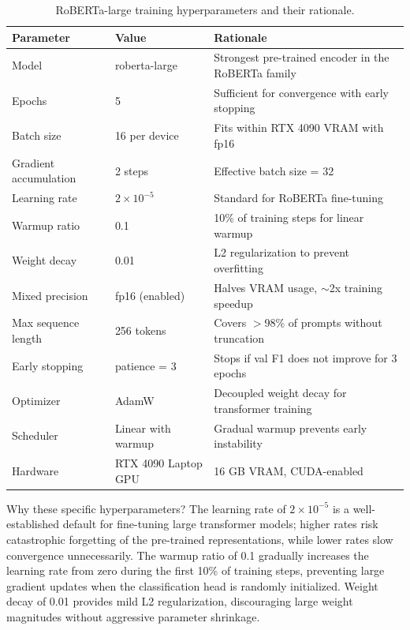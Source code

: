 \documentclass[12pt, letterpaper]{article}   %
\begin{document}
\begin{table}[h!]
    \centering
    \renewcommand{\arraystretch}{1.5}
    \begin{tabularx}{\textwidth}{|l|l|X|}
        \hline
        \textbf{Parameter} & \textbf{Value} & \textbf{Rationale} \\ \hline
        Model & roberta-large & Strongest pre-trained encoder in the RoBERTa family \\ \hline
        Epochs & 5 & Sufficient for convergence with early stopping \\ \hline
        Batch size & 16 per device & Fits within RTX 4090 VRAM with fp16 \\ \hline
        Gradient accumulation & 2 steps & Effective batch size = 32 \\ \hline
        Learning rate & $2 \times 10^{-5}$ & Standard for RoBERTa fine-tuning \\ \hline
        Warmup ratio & 0.1 & 10\% of training steps for linear warmup \\ \hline
        Weight decay & 0.01 & L2 regularization to prevent overfitting \\ \hline
        Mixed precision & fp16 (enabled) & Halves VRAM usage, $\sim$2x training speedup \\ \hline
        Max sequence length & 256 tokens & Covers $>$98\% of prompts without truncation \\ \hline
        Early stopping & patience = 3 & Stops if val F1 does not improve for 3 epochs \\ \hline
        Optimizer & AdamW & Decoupled weight decay for transformer training \\ \hline
        Scheduler & Linear with warmup & Gradual warmup prevents early instability \\ \hline
        Hardware & RTX 4090 Laptop GPU & 16 GB VRAM, CUDA-enabled \\ \hline
    \end{tabularx}
    \caption{RoBERTa-large training hyperparameters and their rationale.}
    \label{tab:train_config}
\end{table}

Why these specific hyperparameters? The learning rate of $2 \times 10^{-5}$ is a well-established default for fine-tuning large transformer models; higher rates risk catastrophic forgetting of the pre-trained representations, while lower rates slow convergence unnecessarily. The warmup ratio of 0.1 gradually increases the learning rate from zero during the first 10\% of training steps, preventing large gradient updates when the classification head is randomly initialized. Weight decay of 0.01 provides mild L2 regularization, discouraging large weight magnitudes without aggressive parameter shrinkage.
\end{document}
